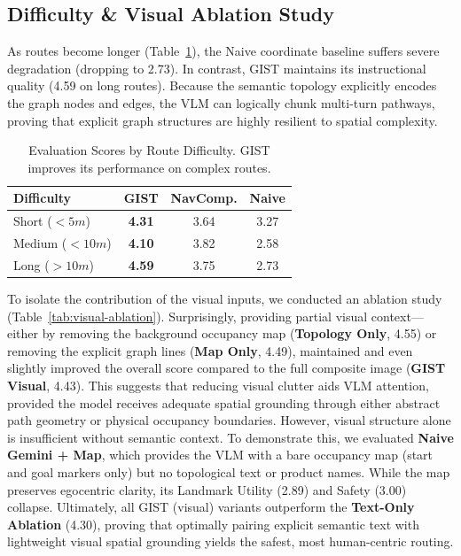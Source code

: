 \documentclass[sigconf,anonymous,review]{acmart}
\begin{document}
\subsection{Difficulty \& Visual Ablation Study}

As routes become longer (Table~\ref{tab:difficulty}), the Naive coordinate baseline suffers severe degradation (dropping to 2.73). In contrast, GIST maintains its instructional quality (4.59 on long routes). Because the semantic topology explicitly encodes the graph nodes and edges, the VLM can logically chunk multi-turn pathways, proving that explicit graph structures are highly resilient to spatial complexity.

\begin{table}[h]
  \centering
  \caption{Evaluation Scores by Route Difficulty. GIST improves its performance on complex routes.}
  \label{tab:difficulty}
  \small
  \begin{tabular}{@{}lccc@{}}
  \toprule
  \textbf{Difficulty} & \textbf{GIST} & \textbf{NavComp.} & \textbf{Naive} \\
  \midrule
  Short ($<5m$) & \textbf{4.31} & 3.64 & 3.27 \\
  Medium ($<10m$) & \textbf{4.10} & 3.82 & 2.58 \\
  Long ($>10m$)  & \textbf{4.59} & 3.75 & 2.73 \\
  \bottomrule
  \end{tabular}
\end{table}

To isolate the contribution of the visual inputs, we conducted an ablation study (Table~\ref{tab:visual-ablation}). Surprisingly, providing partial visual context—either by removing the background occupancy map (\textbf{Topology Only}, 4.55) or removing the explicit graph lines (\textbf{Map Only}, 4.49), maintained and even slightly improved the overall score compared to the full composite image (\textbf{GIST Visual}, 4.43). This suggests that reducing visual clutter aids VLM attention, provided the model receives adequate spatial grounding through either abstract path geometry or physical occupancy boundaries. However, visual structure alone is insufficient without semantic context. To demonstrate this, we evaluated \textbf{Naive Gemini + Map}, which provides the VLM with a bare occupancy map (start and goal markers only) but no topological text or product names. While the map preserves egocentric clarity, its Landmark Utility (2.89) and Safety (3.00) collapse. Ultimately, all GIST (visual) variants outperform the \textbf{Text-Only Ablation} (4.30), proving that optimally pairing explicit semantic text with lightweight visual spatial grounding yields the safest, most human-centric routing.
\end{document}
